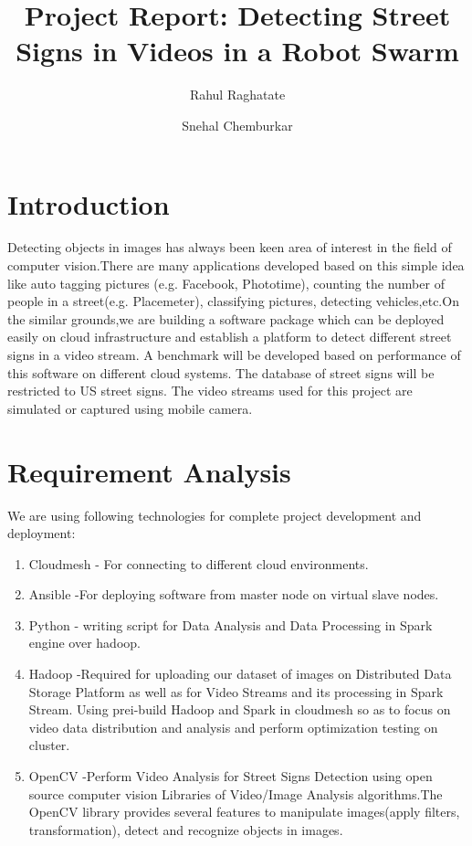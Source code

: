 \documentclass[9pt,twocolumn,twoside]{styles/osajnl}
\title{Project Report: Detecting Street Signs in Videos in a Robot Swarm}
\author[1,*]{Rahul Raghatate}
\author[1,*]{Snehal Chemburkar}
\affil[1]{School of Informatics and Computing, Bloomington, IN 47408, U.S.A.}
\affil[*]{Corresponding authors: rraghata@iu.edu, snehchem@iu.edu}
\begin{document}
\maketitle

\section{Introduction}
Detecting objects in images has always been keen area of interest in the field of computer vision.There are many applications developed based on this simple idea like auto tagging pictures (e.g. Facebook, Phototime), counting the number of people in a street(e.g. Placemeter), classifying pictures, detecting vehicles,etc.On the similar grounds,we are building a software package which can be deployed easily on cloud  infrastructure and establish a platform to  detect different street signs in a video stream. A benchmark will be developed based on performance of this software on different cloud systems. The database of street signs will be restricted to US street signs. The video streams used for this project are simulated or captured using mobile camera. 

\section{Requirement Analysis}
We are using following technologies  for complete project development and deployment:
\begin{enumerate}
\item Cloudmesh - For connecting to different cloud environments. 
\item Ansible -For deploying software from master node on virtual slave nodes.
\item Python - writing script for Data Analysis and Data Processing in Spark engine over hadoop.

\item Hadoop -Required for uploading our dataset of images on Distributed Data Storage Platform as well as for Video Streams and its processing in Spark Stream. Using prei-build Hadoop and Spark in cloudmesh so as to focus on video data distribution and analysis and perform optimization testing on cluster.

\item OpenCV -Perform Video Analysis for Street Signs Detection using open source computer vision Libraries of Video/Image Analysis algorithms.The OpenCV library provides several features to manipulate images(apply filters, transformation), detect and recognize objects in images.
\end{enumerate}
\end{document}
